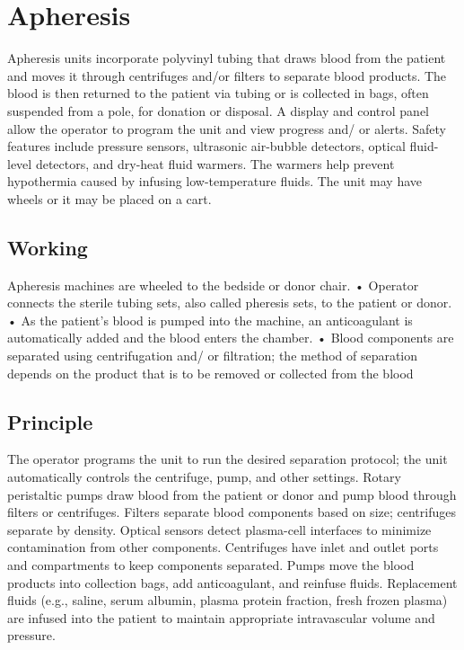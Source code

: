 \documentclass[12pt]{article}
\begin{document}
\section{Apheresis}
Apheresis units incorporate polyvinyl tubing that draws blood
from the patient and moves it through centrifuges and/or filters
to separate blood products. The blood is then returned to the
patient via tubing or is collected in bags, often suspended from
a pole, for donation or disposal. A display and control panel
allow the operator to program the unit and view progress and/
or alerts. Safety features include pressure sensors, ultrasonic
air-bubble detectors, optical fluid-level detectors, and dry-heat
fluid warmers. The warmers help prevent hypothermia caused
by infusing low-temperature fluids. The unit may have wheels or
it may be placed on a cart.





\subsection{Working}
Apheresis machines are wheeled to the bedside or donor
chair.
•	 Operator connects the sterile tubing sets, also called
pheresis sets, to the patient or donor.
•	 As the patient’s blood is pumped into the machine, an
anticoagulant is automatically added and the blood enters
the chamber.
•	 Blood components are separated using centrifugation and/
or filtration; the method of separation depends on the
product that is to be removed or collected from the blood
\subsection{Principle}
The operator programs the unit to run the desired separation
protocol; the unit automatically controls the centrifuge, pump,
and other settings. Rotary peristaltic pumps draw blood from the
patient or donor and pump blood through filters or centrifuges.
Filters separate blood components based on size; centrifuges
separate by density. Optical sensors detect plasma-cell
interfaces to minimize contamination from other components.
Centrifuges have inlet and outlet ports and compartments to
keep components separated. Pumps move the blood products
into collection bags, add anticoagulant, and reinfuse fluids.
Replacement fluids (e.g., saline, serum albumin, plasma protein
fraction, fresh frozen plasma) are infused into the patient to
maintain appropriate intravascular volume and pressure.
\end{document}
